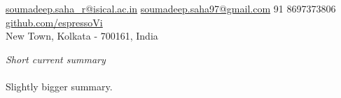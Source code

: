 \documentclass[10pt,a4paper]{article}
\begin{document}
\sloppy


\nobreakvspace{0.3em}

\noindent\href{mailto:soumadeep.saha\_r@isical.ac.in}{soumadeep.saha\_r@isical.ac.in}\sbull
\noindent\href{mailto:soumadeep.saha97@gmail.com}{soumadeep.saha97@gmail.com}\sbull
\textsmaller{+}91 8697373806\sbull
\href{https://github.com/espressoVi}{github.com/espressoVi}\\
New Town, Kolkata - 700161, India

\spacedhrule{0.9em}{-0.4em}  %


\vspace{-1.3em}  %
\begin{multicols}{2}  %
\noindent \emph{Short current summary}
\\
\\
Slightly bigger summary.
\end{multicols}
\end{document}
